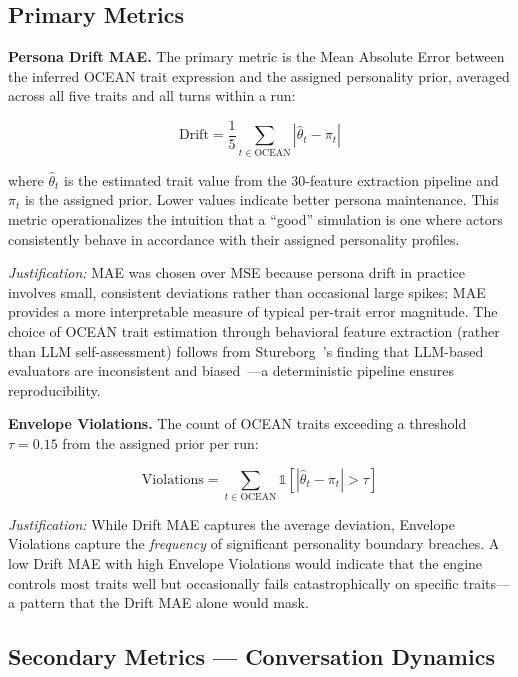 \subsection{Primary Metrics}

\textbf{Persona Drift MAE.} The primary metric is the Mean Absolute Error between the inferred OCEAN trait expression and the assigned personality prior, averaged across all five traits and all turns within a run:

\begin{equation}
    \text{Drift} = \frac{1}{5} \sum_{t \in \text{OCEAN}} \left| \hat{\theta}_t - \pi_t \right|
    \label{eq:drift}
\end{equation}

\noindent where $\hat{\theta}_t$ is the estimated trait value from the 30-feature extraction pipeline and $\pi_t$ is the assigned prior. Lower values indicate better persona maintenance. This metric operationalizes the intuition that a ``good'' simulation is one where actors consistently behave in accordance with their assigned personality profiles.

\textit{Justification:} MAE was chosen over MSE because persona drift in practice involves small, consistent deviations rather than occasional large spikes; MAE provides a more interpretable measure of typical per-trait error magnitude. The choice of OCEAN trait estimation through behavioral feature extraction (rather than LLM self-assessment) follows from Stureborg~\etal's finding that LLM-based evaluators are inconsistent and biased~\cite{stureborg2024inconsistent}---a deterministic pipeline ensures reproducibility.

\textbf{Envelope Violations.} The count of OCEAN traits exceeding a threshold $\tau = 0.15$ from the assigned prior per run:

\begin{equation}
    \text{Violations} = \sum_{t \in \text{OCEAN}} \mathbb{1}\!\left[|\hat{\theta}_t - \pi_t| > \tau\right]
    \label{eq:envelope}
\end{equation}

\textit{Justification:} While Drift MAE captures the average deviation, Envelope Violations capture the \textit{frequency} of significant personality boundary breaches. A low Drift MAE with high Envelope Violations would indicate that the engine controls most traits well but occasionally fails catastrophically on specific traits---a pattern that the Drift MAE alone would mask.


\subsection{Secondary Metrics --- Conversation Dynamics}

